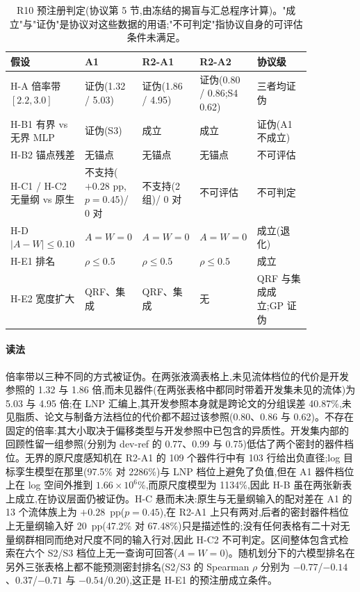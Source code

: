 \documentclass[11pt,a4paper]{ctexart}
\begin{document}
\begin{table}[t]
\centering\footnotesize
\caption{R10 预注册判定(协议第 5 节,由冻结的揭盲与汇总程序计算)。"成立"与"证伪"是协议对这些数据的用语;"不可判定"指协议自身的可评估条件未满足。}
\label{tab:r10decisions}
\begin{tabular}{p{0.20\linewidth}p{0.16\linewidth}p{0.16\linewidth}p{0.16\linewidth}p{0.18\linewidth}}
\toprule
假设 & A1 & R2-A1 & R2-A2 & 协议级 \\
\midrule
H-A 倍率带 $[2.2,3.0]$ & 证伪(1.32 / 5.03) & 证伪(1.86 / 4.95) & 证伪(0.80 / 0.86;S4 0.62) & 三者均证伪 \\
\mbox{H-B1} 有界 vs 无界 MLP & 证伪(S3) & 成立 & 成立 & 证伪(A1 不成立) \\
\mbox{H-B2} 锚点残差 & 无锚点 & 无锚点 & 无锚点 & 不可评估 \\
\mbox{H-C1} / \mbox{H-C2} 无量纲 vs 原生 & 不支持($+0.28$ pp,$p=0.45$)/ 0 对 & 不支持(2 组)/ 0 对 & 不可评估 & 不可判定 \\
H-D $|A-W|\le 0.10$ & $A=W=0$ & $A=W=0$ & $A=W=0$ & 成立(退化) \\
\mbox{H-E1} 排名 & $\rho\le 0.5$ & $\rho\le 0.5$ & $\rho\le 0.5$ & 成立 \\
\mbox{H-E2} 宽度扩大 & QRF、集成 & QRF、集成 & 无 & QRF 与集成成立;GP 证伪 \\
\bottomrule
\end{tabular}
\end{table}

\paragraph{读法} 倍率带以三种不同的方式被证伪。在两张液滴表格上,未见流体档位的代价是开发参照的 1.32 与 1.86 倍,而未见器件(在两张表格中都同时带着开发集未见的流体)为 5.03 与 4.95 倍;在 LNP 汇编上,其开发参照本身就是跨论文的分组误差 40.87\%,未见脂质、论文与制备方法档位的代价都不超过该参照(0.80、0.86 与 0.62)。不存在固定的倍率:其大小取决于偏移类型与开发参照中已包含的异质性。开发集内部的回顾性留一组参照(分别为 dev-ref 的 0.77、0.99 与 0.75)低估了两个密封的器件档位。无界的原尺度感知机在 R2-A1 的 109 个器件行中有 103 行给出负直径;log 目标孪生模型在那里(97.5\% 对 2286\%)与 LNP 档位上避免了负值,但在 A1 器件档位上在 log 空间外推到 $1.66\times10^{6}$\%,而原尺度模型为 1134\%,因此 H-B 虽在两张新表上成立,在协议层面仍被证伪。H-C 悬而未决:原生与无量纲输入的配对差在 A1 的 13 个流体族上为 $+0.28$~pp($p=0.45$),在 R2-A1 上只有两对,后者的密封器件档位上无量纲输入好 20~pp(47.2\% 对 67.48\%)只是描述性的;没有任何表格有二十对无量纲群相同而绝对尺度不同的输入行对,因此 \mbox{H-C2} 不可判定。区间整体包含式检索在六个 S2/S3 档位上无一查询可回答($A=W=0$)。随机划分下的六模型排名在另外三张表格上都不能预测密封排名(S2/S3 的 Spearman $\rho$ 分别为 $-0.77$/$-0.14$、$0.37$/$-0.71$ 与 $-0.54$/$0.20$),这正是 \mbox{H-E1} 的预注册成立条件。
\end{document}
